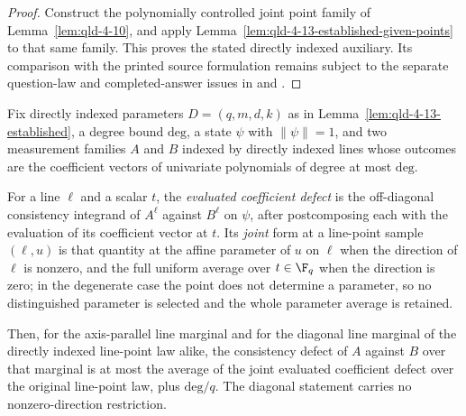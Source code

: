 \begin{proof}
\leanok
{}
Construct the polynomially controlled joint point family of
Lemma~\ref{lem:qld-4-10}, and apply
Lemma~\ref{lem:qld-4-13-established-given-points} to that same family. This
proves the stated directly indexed auxiliary. Its comparison with the printed source formulation remains subject
to the separate question-law and completed-answer issues in
\cite{gap:qpbt_ld-dimension-divisibility} and
\cite{gap:qpbt_combined-lines-error-term}.
\end{proof}

\begin{lemma}
	\label{lem:direct-coefficient-resampling}
	\leanok
	Fix directly indexed parameters $D = (q,m,d,k)$ as in
	Lemma~\ref{lem:qld-4-13-established}, a degree bound $\mathrm{deg}$, a
	state $\psi$ with $\|\psi\| = 1$, and two measurement families $A$ and $B$
	indexed by directly indexed lines whose outcomes are the coefficient
	vectors of univariate polynomials of degree at most $\mathrm{deg}$.

	For a line $\ell$ and a scalar $t$, the \emph{evaluated coefficient
	defect} is the off-diagonal consistency integrand of $A^{\ell}$ against
	$B^{\ell}$ on $\psi$, after postcomposing each with the evaluation of its
	coefficient vector at $t$. Its \emph{joint} form at a line-point sample
	$(\ell, u)$ is that quantity at the affine parameter of $u$ on $\ell$ when
	the direction of $\ell$ is nonzero, and the full uniform average over
	$t \in \F_q$ when the direction is zero; in the degenerate case the point
	does not determine a parameter, so no distinguished parameter is selected
	and the whole parameter average is retained.

	Then, for the axis-parallel line marginal and for the diagonal line
	marginal of the directly indexed line-point law alike, the consistency
	defect of $A$ against $B$ over that marginal is at most the average of the
	joint evaluated coefficient defect over the original line-point law, plus
	$\mathrm{deg}/q$. The diagonal statement carries no nonzero-direction
	restriction.
\end{lemma}
